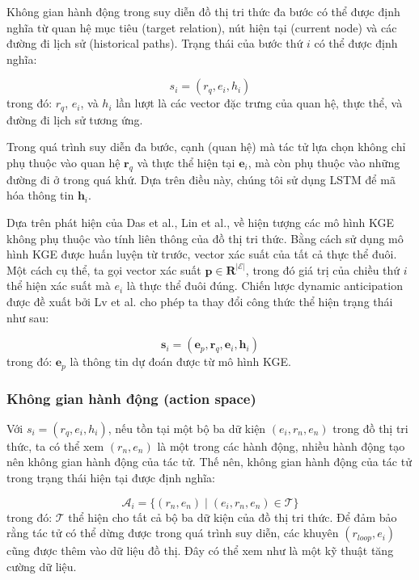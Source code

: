 Không gian hành động trong suy diễn đồ thị tri thức đa bước có thể được định nghĩa từ quan hệ
mục tiêu (target relation), nút hiện tại (current node) và các đường đi lịch sử (historical paths).
Trạng thái của bước thứ $i$ có thể được định nghĩa:

\begin{equation}
    s_i = (r_q, e_i, h_i)
\end{equation}
trong đó: $r_q$, $e_i$, và $h_i$ lần lượt là các vector đặc trưng của quan hệ, thực thể, và đường đi lịch sử tương ứng.

Trong quá trình suy diễn đa bước, cạnh (quan hệ) mà tác tử lựa chọn không chỉ phụ thuộc vào quan hệ $\textbf{r}_q$ và thực thể hiện tại $\textbf{e}_i$, mà còn
phụ thuộc vào những đường đi ở trong quá khứ. Dựa trên điều này, chúng tôi sử dụng LSTM để mã hóa thông tin $\textbf{h}_i$.

Dựa trên phát hiện của Das et al., Lin et al., về hiện tượng các mô hình KGE không phụ thuộc vào tính liên thông của đồ thị tri thức. Bằng cách sử dụng mô hình KGE được huấn luyện từ trước, vector xác suất của tất cả thực thể đuôi. Một cách cụ thể,
ta gọi vector xác suất $\mathbf{p} \in \mathbf{R}^{|\mathcal{E}|}$, trong đó giá trị của chiều thứ $i$ thể hiện xác suất mà $e_i$ là thực thể đuôi đúng.
Chiến lược dynamic anticipation được đề xuất bởi Lv et al.\cite{lv2020dynamic} cho phép ta thay đổi công thức thể hiện trạng thái như sau:

\begin{equation}
    \mathbf{s}_i = (\mathbf{e}_p, \mathbf{r}_q, \mathbf{e}_i, \mathbf{h}_i)
\end{equation}
trong đó: $\mathbf{e}_p$ là thông tin dự đoán được từ mô hình KGE.

\subsubsection{Không gian hành động (action space)}

Với $s_i = (r_q, e_i, h_i)$, nếu tồn tại một bộ ba dữ kiện $(e_i, {r}_n, {e}_n)$ trong đồ thị
tri thức, ta có thể xem $({r}_n, {e}_n)$ là một trong các hành động, nhiều hành động tạo nên không gian hành động của tác tử. Thế nên, không gian 
hành động của tác tử trong trạng thái hiện tại được định nghĩa:

\begin{equation}
    \mathcal{A}_i = \{({r}_n, {e}_n) \mid ({e}_i, {r}_n, {e}_n) \in \mathcal{T}\}
\end{equation}
trong đó: $\mathcal{T}$ thể hiện cho tất cả bộ ba dữ kiện của đồ thị tri thức. Để đảm bảo rằng tác tử có thể dừng được trong quá trình suy diễn,
các khuyên $({r}_{loop}, {e}_i)$ cũng được thêm vào dữ liệu đồ thị. Đây có thể xem như là một kỹ thuật tăng cường dữ liệu.

